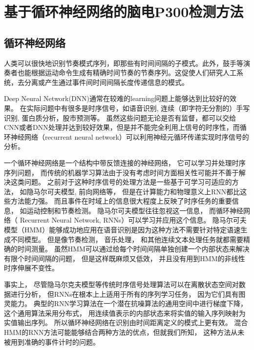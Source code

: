 \chapter{基于循环神经网络的脑电P300检测方法}

\section{循环神经网络}

人类可以很快地识别节奏模式序列，即那些有时间间隔的子模式。此外，鼓手等演奏者也能根据运动命令生成有精确时间节奏的节奏序列。这促使人们研究人工系统，去分离或产生通过事件间时间间隔长度传递信息的模式。

Deep Neural Network(DNN)通常在较难的learning问题上能够达到比较好的效果。 在实际问题中有很多是时序信号，如语音识别, 连续（即字符无分割的）手写识别, 蛋白质分析，股市预测等。 虽然这些问题无论是否有监督，都可以交给CNN或者DNN处理并达到较好效果\cite{abdel2014convolutional,lecun1995convolutional,ciresan2011convolutional,lecun1994word,lauer2007trainable,baldi1996hybrid,zhu2014stock}，但是并不能完全利用上信号的时序性，而循环神经网络（recurrent neural network）可以利用神经元循环传递实现时序信号的分析。

一个循环神经网络是一个结构中带反馈连接的神经网络， 它可以学习并处理时序序列问题， 而传统的机器学习算法由于没有考虑时间方面相关性可能并不善于解决这类问题。 之前对于这种时序信号的处理方法是一些基于可学习可适应的方法， 如隐马尔可夫模型\cite{eddy1996hidden}, 前向网络等， 但是在计算能力和物理意义上RNN都比这些方法能力强。 而且事件在时域上的信息很大程度上反映了时序任务的重要信息， 如运动控制和节奏检测。 隐马尔可夫模型往往忽视这一信息， 而循环神经网络（ Recurrent Neural Network, RNNs）可以学习并应用这个信息。 隐马尔可夫模型（HMM）能够成功地应用在语音识别是因为这种方法不需要针对特定语速生成不同模型。 但是像节奏检测， 音乐处理， 和其他连续文本处理任务就都需要精确的时间测量。 虽然HMM可以通过给每个时间间隔单独创建一个内部状态来解决有限个时间间隔的问题， 但是这样既麻烦又低效， 并且没有用到HMM的非线性时序伸展不变性。

事实上， 尽管隐马尔克夫模型等传统时序信号处理算法可以在离散状态空间对数据进行分析， 但RNNs在根本上上适用于所有的序列学习任务， 因为它们具有图灵能力\cite{siegelmann1995computational}。 典型的RNN学习算法在一个潜在抗噪算法的通用空间中进行梯度下降\cite{pearlmutter1995gradient}， 这个通用算法采用分布式， 用连续值表示的内部状态来将实值的输入序列映射为实值输出序列。 所以循环神经网络在识别由时间距离定义的模式上更有效。 混合HMM的RNN方法\cite{bengio1995input}可能能够结合两种方法的优点，但就我们所知， 这种方法从未被用到准确的事件计时的问题。



